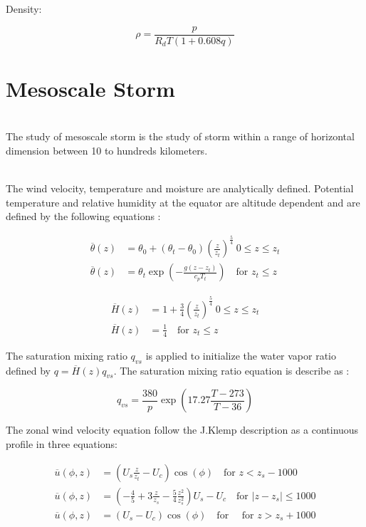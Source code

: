 \documentclass[times,doublespace]{fldauth}
\begin{document}
Density:

\begin{equation}
\rho=\frac{p}{R_dT(1+0.608q)}
\end{equation}

\clearpage

\section{Mesoscale Storm}  \label{sec:3}

~\\ The study of mesoscale storm is the study of storm within a range of horizontal dimension  between 10 to hundreds kilometers. 

~\\The wind velocity, temperature and moisture are analytically defined. Potential temperature and relative humidity at the equator are altitude dependent and are defined by the following equations :

\begin{equation}
\begin{split}
\overline{\theta}(z)&=\theta_0 + (\theta_t - \theta_0)\left(\frac{z}{z_t}\right)^{\frac{5}{4}}  \ 0 \leq z \leq z_t \\
\overline{\theta}(z)&=\theta_t \exp\left(-\frac{g(z-z_t)}{c_pT_{t}}\right) \text{ ~~for   }  z_t \leq z
\end{split}
\end{equation}

 \begin{equation}
\begin{split}
\overline{H}(z)&=1 + \frac{3}{4}\left(\frac{z}{z_t}\right)^{\frac{5}{4}}  \ 0 \leq z \leq z_t \\
\overline{H}(z)&= \frac{1}{4} \text{ ~~for   }  z_t \leq z
\end{split}
\end{equation}

The saturation mixing ratio $q_{vs}$ is applied to initialize the water vapor ratio defined by $q = \overline{H}(z) q_{vs} $. The saturation mixing ratio equation is describe as :

 \begin{equation}
q_{vs}=\frac{380}{p}\exp\left(17.27\frac{ T-273}{T-36}\right)
\end {equation}

The zonal wind velocity equation follow the J.Klemp description as a continuous profile in three equations:

\begin{equation}
\begin{split}
\overline{u}(\phi,z)&=\left(U_s\frac{z}{z_t}-U_c\right)\cos(\phi)  \text{ ~~for   } z < z_s-1000 \\
\overline{u}(\phi,z)&=\left(-\frac{4}{5}+3\frac{z}{z_s}-\frac{5}{4}\frac{z^2}{z_s^2}\right)U_s-U_c \text{ ~~for   }  |z-z_s| \leq 1000 \\
\overline{u}(\phi,z)&=\left(U_s-U_c\right)\cos(\phi)  \text{ ~~for   } \text{ ~~for   }  z > z_s+1000 
\end{split}
\end{equation}
\end{document}
